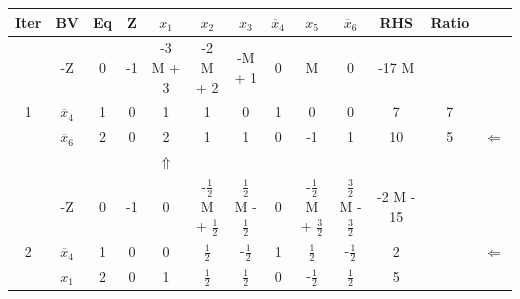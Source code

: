 \documentclass[12pt]{article}
\begin{document}
\begin{center}
\begin{tabular}{|c|c|c|c|cccccc|c|c|c|}
\hline
 Iter  &  BV                &  Eq  &   Z  &       $x_1$  &  $x_2$                             &                            $x_3$  &  $\overline{x}_4$  &                             $x_5$  &                 $\overline{x}_6$  &        RHS  &  Ratio  &                \\
\hline
       &  -Z                &   0  &  -1  &    -3 M + 3  &  -2 M + 2                          &                           -M + 1  &                 0  &                                 M  &                                0  &      -17 M  &         &                \\
    1  &  $\overline{x}_4$  &   1  &   0  &           1  &  1                                 &                                0  &                 1  &                                 0  &                                0  &          7  &      7  &                \\
       &  $\overline{x}_6$  &   2  &   0  &           2  &  1                                 &                                1  &                 0  &                                -1  &                                1  &         10  &      5  &  $\Leftarrow$  \\
\hline
       &                    &      &      &  $\Uparrow$  &                                    &                                   &                    &                                    &                                   &             &         &                \\
\hline
       &  -Z                &   0  &  -1  &           0  &  -$\frac{1}{2}$ M + $\frac{1}{2}$  &  $\frac{1}{2}$ M - $\frac{1}{2}$  &                 0  &  -$\frac{1}{2}$ M + $\frac{3}{2}$  &  $\frac{3}{2}$ M - $\frac{3}{2}$  &  -2 M - 15  &         &                \\
    2  &  $\overline{x}_4$  &   1  &   0  &           0  &  $\frac{1}{2}$                     &                   -$\frac{1}{2}$  &                 1  &                     $\frac{1}{2}$  &                   -$\frac{1}{2}$  &          2  &         &  $\Leftarrow$  \\
       &  $x_1$             &   2  &   0  &           1  &  $\frac{1}{2}$                     &                    $\frac{1}{2}$  &                 0  &                    -$\frac{1}{2}$  &                    $\frac{1}{2}$  &          5  &         &                \\

\end{tabular}
\end{center}
\end{document}
